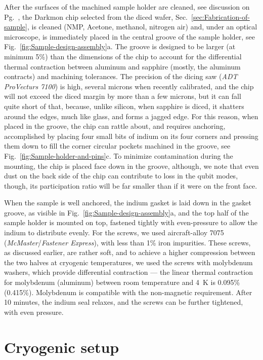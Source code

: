 After the surfaces of the machined sample holder are cleaned, see
discussion on Pg.~\pageref{par: Surface-preparation}, the Darkmon
chip selected from the diced wafer, Sec.~\ref{sec:Fabrication-of-sample},
is cleaned (NMP, Acetone, methanol, nitrogen air) and, under an optical
microscope, is immediately placed in the central groove of the sample
holder, see Fig.~\ref{fig:Sample-design-assembly}a. The groove is
designed to be larger (at minimum 5\%) than the dimensions of the
chip to account for the differential thermal contraction between aluminum
and sapphire (mostly, the aluminum contracts) and machining tolerances.
The precision of the dicing saw (\emph{ADT ProVecturs 7100}) is high,
several microns when recently calibrated, and the chip will not exceed
the diced margin by more than a few microns, but it can fall quite
short of that, because, unlike silicon, when sapphire is diced, it
shatters around the edges, much like glass, and forms a jagged edge.
For this reason, when placed in the groove, the chip can rattle about,
and requires anchoring, accomplished by placing four small bits of
indium on its four corners and pressing them down to fill the corner
circular pockets machined in the groove, see Fig.~\ref{fig:Sample-holder-and-pins}c.
To minimize contamination during the mounting, the chip is placed
face down in the groove, although, we note that even dust on the back
side of the chip can contribute to loss in the qubit modes, though,
its participation ratio will be far smaller than if it were on the
front face. 

When the sample is well anchored, the indium gasket is laid down in
the gasket groove, as visible in Fig.~\ref{fig:Sample-design-assembly}a,
and the top half of the sample holder is mounted on top, fastened
tightly with even-pressure to allow the indium to distribute evenly.
For the screws, we used aircraft-alloy 7075 (\emph{McMaster}/\emph{Fastener
Express}), with less than 1\% iron impurities. These screws, as discussed
earlier, are rather soft, and to achieve a higher compression between
the two halves at cryogenic temperatures, we used the screws with
\label{par:molybdenum}molybdenum washers, which provide differential
contraction — the linear thermal contraction for molybdenum (aluminum)
between room temperature and 4~K is 0.095\% (0.415\%). Molybdenum
is compatible with the non-magnetic requirement. After 10 minutes,
the indium seal relaxes, and the screws can be further tightened,
with even pressure.


\section{Cryogenic setup\label{sec:Cryogenic-setup} }

